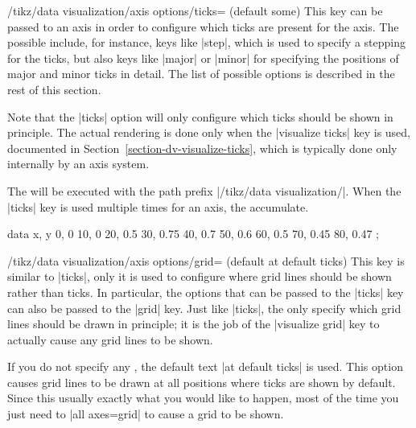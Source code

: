 \begin{key}{/tikz/data visualization/axis options/ticks= (default some)}
    This key can be passed to an axis in order to configure which ticks are
    present for the axis. The possible  include, for instance,
    keys like |step|, which is used to specify a stepping for the ticks, but
    also keys like |major| or |minor| for specifying the positions of major and
    minor ticks in detail. The list of possible options is described in the
    rest of this section.

    Note that the |ticks| option will only configure which ticks should be
    shown in principle. The actual rendering is done only when the
    |visualize ticks| key is used, documented in
    Section~\ref{section-dv-visualize-ticks}, which is typically done only
    internally by an axis system.

    The  will be executed with the path prefix
    |/tikz/data visualization/|. When the |ticks| key is used multiple times
    for an axis, the  accumulate.
\begin{codeexample}[width=6cm]
\tikz \datavisualization [
  scientific axes, visualize as line,
  x axis={ticks={step=24, minor steps between steps=3},
          label=hours}]
  data {
    x, y
    0, 0
    10, 0
    20, 0.5
    30, 0.75
    40, 0.7
    50, 0.6
    60, 0.5
    70, 0.45
    80, 0.47
  };
\end{codeexample}
\end{key}

\begin{key}{/tikz/data visualization/axis options/grid= (default at default ticks)}
    This key is similar to |ticks|, only it is used to configure where grid
    lines should be shown rather than ticks. In particular, the options that
    can be passed to the |ticks| key can also be passed to the |grid| key. Just
    like |ticks|, the  only specify which grid lines should be
    drawn in principle; it is the job of the |visualize grid| key to actually
    cause any grid lines to be shown.

    If you do not specify any , the default text
    |at default ticks| is used. This option causes grid lines to be drawn at
    all positions where ticks are shown by default. Since this usually exactly
    what you would like to happen, most of the time you just need to
    |all axes=grid| to cause a grid to be shown.
\end{key}


